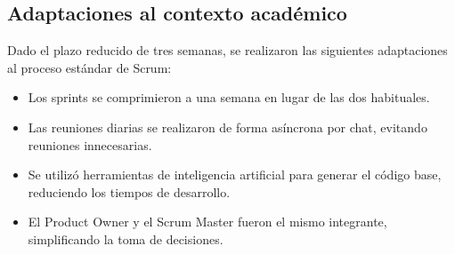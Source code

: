 \subsection{Adaptaciones al contexto académico}

Dado el plazo reducido de tres semanas, se realizaron las siguientes
adaptaciones al proceso estándar de Scrum:

\begin{itemize}
  \item Los sprints se comprimieron a una semana en lugar de las dos habituales.
  \item Las reuniones diarias se realizaron de forma asíncrona por chat,
    evitando reuniones innecesarias.
  \item Se utilizó herramientas de inteligencia artificial para generar el
    código base, reduciendo los tiempos de desarrollo.
  \item El Product Owner y el Scrum Master fueron el mismo integrante,
    simplificando la toma de decisiones.
\end{itemize}
